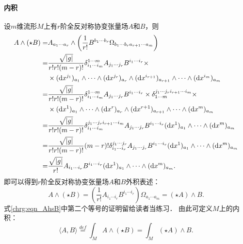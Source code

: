 \paragraph{内积}
设$m$维流形$M$上有$r$阶全反对称协变张量场$A$和$B$，则
\begin{align*}
	A \wedge (\star B) = & A_{a_1\cdots a_r} \wedge \left(\frac{1}{r!} B^{b_1 \cdots b_r} 
	\Omega_{b_1 \cdots b_r a_{r+1} \cdots a_m} \right)  \\
	=& \frac{\sqrt{|g|}}{r! r! (m-r)!} 
	\delta_{i_{1} \cdots i_m}^{1 \cdots m}	
	A_{j_1\cdots j_r}  B^{i_1\cdots i_r} \times \\
	&\times ({\rm d}x^{j_1})_{a_1} \wedge \cdots \wedge({\rm d}x^{j_r})_{a_r} 
	\wedge ({\rm d}x^{i_{r+1}})_{a_{r+1}} \wedge \cdots \wedge({\rm d}x^{i_m})_{a_m} \\
	=& \frac{\sqrt{|g|}}{r! r! (m-r)!} 
	\delta_{i_{1} \cdots i_m}^{1 \cdots m}	
	A_{j_1\cdots j_r}  B^{i_1\cdots i_r} \times
	\delta^{j_{1} \cdots j_r i_{r+1}\cdots i_m }_{1 \cdots m}	\times \\
	&\times ({\rm d}x^{1})_{a_1} \wedge \cdots \wedge({\rm d}x^{r})_{a_r} 
	\wedge ({\rm d}x^{r+1})_{a_{r+1}} \wedge \cdots \wedge({\rm d}x^{m})_{a_m} \\
	=& \frac{\sqrt{|g|}}{r! r! (m-r)!} 
	\delta_{i_{1} \cdots i_m}^{j_{1} \cdots j_r i_{r+1}\cdots i_m }
	A_{j_1\cdots j_r}  B^{i_1\cdots i_r} 
	({\rm d}x^{1})_{a_1} \wedge \cdots  \wedge({\rm d}x^{m})_{a_m} \\
	=& \frac{\sqrt{|g|}}{r! r! (m-r)!} (m-r)!
	\delta_{i_{1} \cdots i_r}^{j_{1} \cdots j_r }
	A_{j_1\cdots j_r}  B^{i_1\cdots i_r} 
	({\rm d}x^{1})_{a_1} \wedge \cdots  \wedge({\rm d}x^{m})_{a_m} \\
	=& \frac{\sqrt{|g|}}{r!} 
	A_{i_1\cdots i_r}  B^{i_1\cdots i_r} 
	({\rm d}x^{1})_{a_1} \wedge \cdots  \wedge({\rm d}x^{m})_{a_m}.
\end{align*}
即可以得到$r$阶全反对称协变张量场$A$和$B$外积表述：
\begin{equation}\label{chrg:eqn_AhsB}
	A \wedge (\star B) = \left(\frac{1}{r!} A_{i_1\cdots i_r}  B^{i_1\cdots i_r} \right) 
	\Omega_{a_{1} \cdots a_m} = (\star A) \wedge B.
\end{equation}
式\eqref{chrg:eqn_AhsB}中第二个等号的证明留给读者当练习．
由此可定义$M$上的内积：
\begin{equation}\label{chrg:eqn_AhsB-inner}
	\langle A, B\rangle \overset{def}{=}\int_{M} A \wedge (\star B) = \int_{M} (\star A) \wedge B.
\end{equation}


